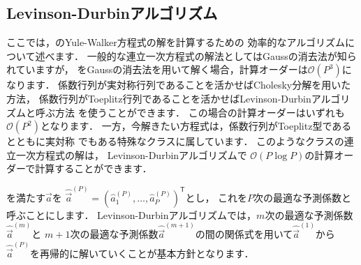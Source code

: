 \subsection{Levinson-Durbinアルゴリズム}

ここでは，のYule-Walker方程式の解を計算するための
効率的なアルゴリズムについて述べます．
一般的な連立一次方程式の解法としてはGaussの消去法が知られていますが，
をGaussの消去法を用いて解く場合，計算オーダーは$\mathcal{O}(P^3)$になります．
係数行列が実対称行列であることを活かせばCholesky分解を用いた方法，
係数行列がToeplitz行列であることを活かせばLevinson-Durbinアルゴリズムと呼ぶ方法
を使うことができます．
この場合の計算オーダーはいずれも$\mathcal{O}(P^2)$となります．
一方，今解きたい方程式は，係数行列がToeplitz型であるとともに実対称
でもある特殊なクラスに属しています．
このようなクラスの連立一次方程式の解は，
Levinson-Durbinアルゴリズムで
$\mathcal{O}(P\log P)$の計算オーダーで計算することができます．

を満たす$\Vec{a}$を
$\hat{\Vec{a}}^{(P)} = (\hat{a}_1^{(P)},\ldots,\hat{a}_P^{(P)})^{\mathsf T}$とし，
これを$P$次の最適な予測係数と呼ぶことにします．
Levinson-Durbinアルゴリズムでは，$m$次の最適な予測係数$\hat{\Vec{a}}^{(m)}$と
$m+1$次の最適な予測係数$\hat{\Vec{a}}^{(m+1)}$の間の関係式を用いて$\hat{\Vec{a}}^{(1)}$から$\hat{\Vec{a}}^{(P)}$を再帰的に解いていくことが基本方針となります．

